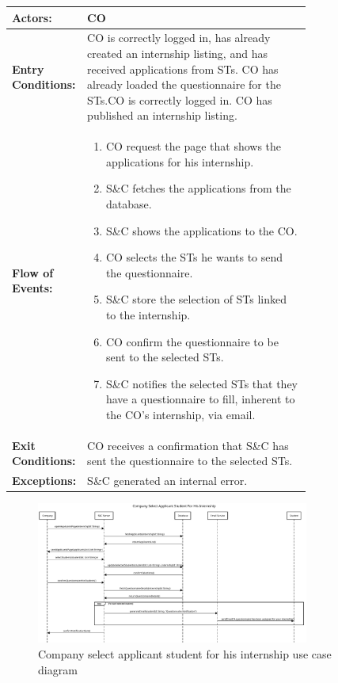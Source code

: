 \begin{center}
    \begin{longtable}{|l|p{0.75\linewidth}|}
        \hline
        \textbf{Actors:}           & CO                                                                                                                   \\
        \hline
        \textbf{Entry Conditions:} & CO is correctly logged in, has already created an internship listing, and has received applications from STs.
        CO has already loaded the questionnaire for the STs.CO is correctly logged in. CO has published an internship listing.                             \\
        \hline
        \textbf{Flow of Events:}   & \begin{enumerate}
            \item CO request the page that shows the applications for his internship.
            \item S\&C fetches the applications from the database.
            \item S\&C shows the applications to the CO.
            \item CO selects the STs he wants to send the questionnaire.
            \item S\&C store the selection of STs linked to the internship.
            \item CO confirm the questionnaire to be sent to the selected STs.
            \item S\&C notifies the selected STs that they have a questionnaire to fill, inherent to the CO's internship, via email.                             
                                     \end{enumerate} \\
        \hline
        \textbf{Exit Conditions:}  & CO receives a confirmation that S\&C has sent the questionnaire to the selected STs.                                 \\
        \hline
        \textbf{Exceptions:}       & S\&C generated an internal error.                                                                                     \\
        \hline
    \end{longtable}
\end{center}

\begin{figure}[H]
    \centering
    \includegraphics[width=0.8\textwidth]{Images/UC_12.pdf}
    \caption{Company select applicant student for his internship use case diagram}
    \label{fig:use-case-diagram-12}
\end{figure}

